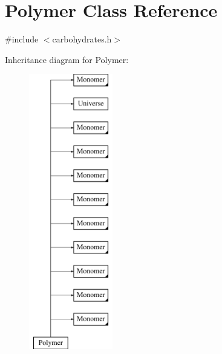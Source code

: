 \hypertarget{classPolymer}{}\section{Polymer Class Reference}
\label{classPolymer}


{\ttfamily \#include $<$carbohydrates.\+h$>$}

Inheritance diagram for Polymer\+:\begin{figure}[H]
\begin{center}
\leavevmode
\includegraphics[height=12.000000cm]{classPolymer}
\end{center}
\end{figure}
